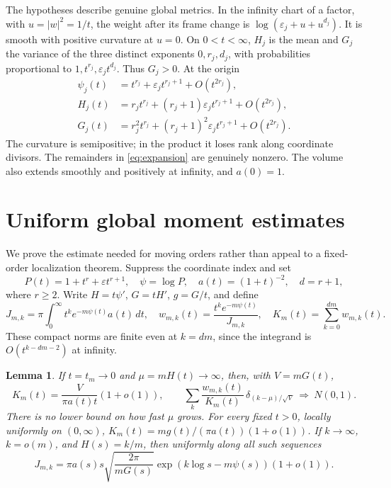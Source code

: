 \documentclass[11pt]{article}
\newtheorem{lemma}[theorem]{Lemma}
\theoremstyle{remark}\newtheorem{remark}[theorem]{Remark}
\begin{document}
The hypotheses describe genuine global metrics. In the infinity chart of a
factor, with $u=|w|^2=1/t$, the weight after its frame change is
$\log(\varepsilon_j+u+u^{d_j})$. It is smooth with positive curvature
at $u=0$. On $0<t<\infty$, $H_j$ is the mean and $G_j$ the variance
of the three distinct exponents $0,r_j,d_j$, with probabilities proportional
to $1,t^{r_j},\varepsilon_jt^{d_j}$. Thus $G_j>0$. At the origin
\begin{align}
 \psi_j(t)&=t^{r_j}+\varepsilon_jt^{r_j+1}+O(t^{2r_j}),\label{eq:expansion}\\
 H_j(t)&=r_jt^{r_j}+(r_j+1)\varepsilon_jt^{r_j+1}+O(t^{2r_j}),\\
 G_j(t)&=r_j^2t^{r_j}+(r_j+1)^2\varepsilon_jt^{r_j+1}+O(t^{2r_j}).
\end{align}
The curvature is semipositive; in the product it loses rank along coordinate
divisors. The remainders in \eqref{eq:expansion} are genuinely nonzero.
The volume also extends smoothly and positively at infinity, and $a(0)=1$.

\section{Uniform global moment estimates}
We prove the estimate needed for moving orders rather than appeal to a
fixed-order localization theorem. Suppress the coordinate index and set
\[
 P(t)=1+t^r+\varepsilon t^{r+1},\quad \psi=\log P,\quad
 a(t)=(1+t)^{-2},\quad d=r+1,
\]
where $r\geq2$. Write $H=t\psi'$, $G=tH'$, $g=G/t$, and define
\begin{equation}\label{eq:moment}
 J_{m,k}=\pi\int_0^\infty t^ke^{-m\psi(t)}a(t)\,dt,
 \quad w_{m,k}(t)=\frac{t^ke^{-m\psi(t)}}{J_{m,k}},
 \quad K_m(t)=\sum_{k=0}^{dm}w_{m,k}(t).
\end{equation}
These compact norms are finite even at $k=dm$, since the integrand is
$O(t^{k-dm-2})$ at infinity.

\begin{lemma}\label{lem:moments}
If $t=t_m\to0$ and $\mu=mH(t)\to\infty$, then, with $V=mG(t)$,
\begin{equation}\label{eq:fullkernel}
 K_m(t)=\frac{V}{\pi a(t)t}(1+o(1)),\qquad
 \sum_k\frac{w_{m,k}(t)}{K_m(t)}\,
 \delta_{(k-\mu)/\sqrt V}\ \Longrightarrow\ N(0,1).
\end{equation}
There is no lower bound on how fast $\mu$ grows. For every fixed $t>0$,
locally uniformly on $(0,\infty)$,
$K_m(t)=mg(t)/(\pi a(t))(1+o(1))$.
If $k\to\infty$, $k=o(m)$, and $H(s)=k/m$, then uniformly along all
such sequences
\begin{equation}\label{eq:laplace}
 J_{m,k}=\pi a(s)s\sqrt{\frac{2\pi}{mG(s)}}
 \exp(k\log s-m\psi(s))(1+o(1)).
\end{equation}
\end{lemma}
\end{document}
